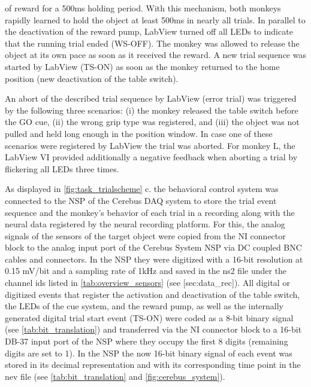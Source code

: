 {of reward for a 500ms holding period. With this mechanism, both monkeys rapidly learned to hold the object at least 500ms in nearly all trials. In parallel to the deactivation of the reward pump, LabView turned off all LEDs to indicate that the running trial ended (WS-OFF). The monkey was allowed to release the object at its own pace as soon as it received the reward. A new trial sequence was started by LabView (TS-ON) as soon as the monkey returned to the home position (new deactivation of the table switch).

An abort of the described trial sequence by LabView (error trial) was triggered by the following three scenarios: (i) the monkey released the table switch before the GO cue, (ii) the wrong grip type was registered, and (iii) the object was not pulled and held long enough in the position window. In case one of these scenarios were registered by LabView the trial was aborted. For monkey L, the LabView VI provided additionally a negative feedback when aborting a trial by flickering all LEDs three times. 

As displayed in \cref{fig:task_trialscheme} c. the behavioral control system was connected to the NSP of the Cerebus DAQ system to store the trial event sequence and the monkey's behavior of each trial in a recording along with the neural data registered by the neural recording platform. For this, the analog signals of the sensors of the target object were copied from the NI connector block to the analog input port of the Cerebus System NSP via DC coupled BNC cables and connectors. In the NSP they were digitized with a 16-bit resolution at 0.15 mV/bit and a sampling rate of 1kHz and saved in the ns2 file under the channel ids listed in \cref{tab:overview_sensors} (see [sec:data\_rec]). All digital or digitized events that register the activation and deactivation of the table switch, the LEDs of the cue system, and the reward pump, as well as the internally generated digital trial start event (TS-ON) were coded as a 8-bit binary signal (see \cref{tab:bit_translation}) and transferred via the NI connector block to a 16-bit DB-37 input port of the NSP where they occupy the first 8 digits (remaining digits are set to 1). In the NSP the now 16-bit binary signal of each event was stored in its decimal representation and with its corresponding time point in the nev file (see \cref{tab:bit_translation} and \cref{fig:cerebus_system}).

}
